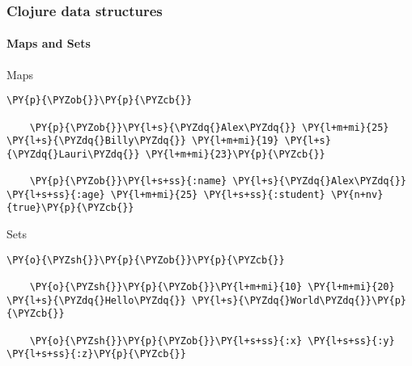 \begin{frame}[fragile]
  \frametitle{Clojure data structures}
  \framesubtitle{Maps and Sets}

  \begin{block}{Maps}
  \begin{Verbatim}[commandchars=\\\{\}]
    \PY{p}{\PYZob{}}\PY{p}{\PYZcb{}}

    \PY{p}{\PYZob{}}\PY{l+s}{\PYZdq{}Alex\PYZdq{}} \PY{l+m+mi}{25} \PY{l+s}{\PYZdq{}Billy\PYZdq{}} \PY{l+m+mi}{19} \PY{l+s}{\PYZdq{}Lauri\PYZdq{}} \PY{l+m+mi}{23}\PY{p}{\PYZcb{}}

    \PY{p}{\PYZob{}}\PY{l+s+ss}{:name} \PY{l+s}{\PYZdq{}Alex\PYZdq{}} \PY{l+s+ss}{:age} \PY{l+m+mi}{25} \PY{l+s+ss}{:student} \PY{n+nv}{true}\PY{p}{\PYZcb{}}
  \end{Verbatim}
  \end{block}

  \begin{block}{Sets}
  \begin{Verbatim}[commandchars=\\\{\}]
    \PY{o}{\PYZsh{}}\PY{p}{\PYZob{}}\PY{p}{\PYZcb{}}

    \PY{o}{\PYZsh{}}\PY{p}{\PYZob{}}\PY{l+m+mi}{10} \PY{l+m+mi}{20} \PY{l+s}{\PYZdq{}Hello\PYZdq{}} \PY{l+s}{\PYZdq{}World\PYZdq{}}\PY{p}{\PYZcb{}}

    \PY{o}{\PYZsh{}}\PY{p}{\PYZob{}}\PY{l+s+ss}{:x} \PY{l+s+ss}{:y} \PY{l+s+ss}{:z}\PY{p}{\PYZcb{}}
  \end{Verbatim}
  \end{block}
\end{frame}


